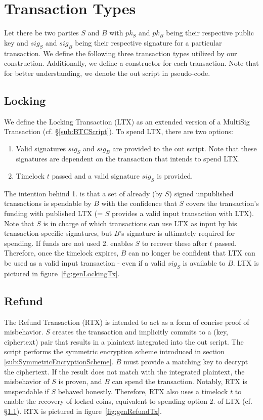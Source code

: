 \documentclass{cacthesis}
\begin{document}
	   \section{Transaction Types}
	   \label{sec:OurTransactionTypes}
        Let there be two parties $S$ and $B$ with $pk_S$ and $pk_B$  being their respective public key and $sig_S$ and $sig_B$ being their respective signature for a particular transaction. We define the following three transaction types utilized by our construction. Additionally, we define a constructor for each transaction. Note that for better understanding, we denote the out script in pseudo-code.
        
        \subsection{Locking}
        \label{sub:LockingTx}
        We define the Locking Transaction (LTX) as an extended version of a MultiSig Transaction (cf. §\ref{sub:BTCScript}). To spend LTX, there are two options:
        \begin{enumerate}
	        \item Valid signatures $sig_S$ and $sig_B$ are provided to the out script. Note that these signatures are dependent on the transaction that intends to spend LTX.
	        \item Timelock $t$ passed and a valid signature $sig_S$ is provided.
        \end{enumerate}
        The intention behind 1. is that a set of already (by $S$) signed unpublished transactions is spendable by $B$ with the confidence that $S$ covers the transaction's funding with published LTX (= $S$ provides a valid input transaction with LTX). Note that $S$ is in charge of which transactions can use LTX as input by his transaction-specific signatures, but $B$'s signature is ultimately required for spending.
        If funds are not used 2. enables $S$ to recover these after $t$ passed. Therefore, once the timelock expires, $B$ can no longer be confident that LTX can be used as a valid input transaction - even if a valid $sig_S$ is available to $B$. LTX is pictured in \mbox{figure \ref{fig:genLockingTx}}.
        
        \subsection{Refund}
        \label{sub:RefundTx}
        The Refund Transaction (RTX) is intended to act as a form of concise proof of misbehavior. $S$ creates the transaction and implicitly commits to a (key, ciphertext) pair that results in a plaintext integrated into the out script. The script performs the symmetric encryption scheme introduced in section \ref{sub:SymmetricEncryptionScheme}. $B$ must provide a matching key to decrypt the ciphertext. If the result does not match with the integrated plaintext, the misbehavior of $S$ is proven, and $B$ can spend the transaction. Notably, RTX is unspendable if $S$ behaved honestly. Therefore, RTX also uses a timelock $t$ to enable the recovery of locked coins, equivalent to spending option 2. of LTX (cf. §\ref{sub:LockingTx}). RTX is pictured in \mbox{figure \ref{fig:genRefundTx}}.   
        
\end{document}
